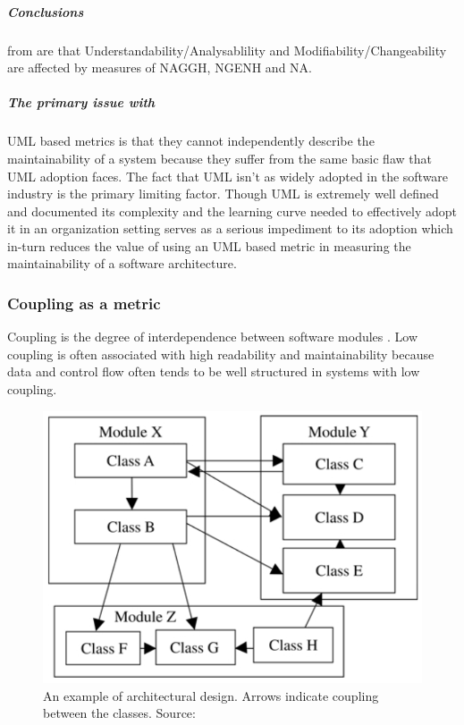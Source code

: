 \documentclass[15pt]{article}
\begin{document}
\subparagraph{Conclusions} from \cite{genero_building_2007} are that Understandability/Analysablility and Modifiability/Changeability are affected by measures of NAGGH, NGENH and NA.

\subparagraph{The primary issue with } UML based metrics is that they cannot independently describe the maintainability of a system because they suffer from the same basic flaw that UML adoption faces. The fact that UML isn't as widely adopted in the software industry is the primary limiting factor. Though UML is extremely well defined and documented its complexity and the learning curve needed to effectively adopt it in an organization setting serves as a serious impediment to its adoption which in-turn reduces the value of using an UML based metric in measuring the maintainability of a software architecture.

\subsubsection{Coupling as a metric}

Coupling is the degree of interdependence between software modules \cite{iso_international_2006}. Low coupling is often associated with high readability and maintainability because data and control flow often tends to be well structured in systems with low coupling.\\

\begin{figure}
	\includegraphics[width=0.9\linewidth]{./coupling}
	\caption{An example of architectural design.
	Arrows indicate coupling between the classes. Source:\cite{lindvall_empirically-based_2003}}
	\label{fig:coupling}
\end{figure}
\end{document}
